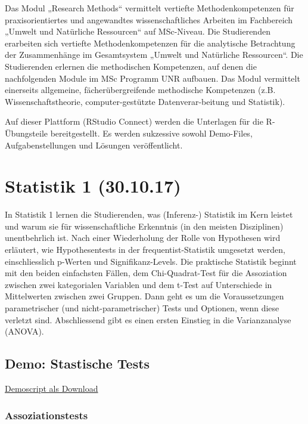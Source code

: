 \documentclass[]{book}
\begin{document}
Das Modul „Research Methods`` vermittelt vertiefte Methodenkompetenzen
für praxisorientiertes und angewandtes wissenschaftliches Arbeiten im
Fachbereich „Umwelt und Natürliche Ressourcen`` auf MSc-Niveau. Die
Studierenden erarbeiten sich vertiefte Methodenkompetenzen für die
analytische Betrachtung der Zusammenhänge im Gesamtsystem „Umwelt und
Natürliche Ressourcen``. Die Studierenden erlernen die methodischen
Kompetenzen, auf denen die nachfolgenden Module im MSc Programm UNR
aufbauen. Das Modul vermittelt einerseits allgemeine,
fächerübergreifende methodische Kompetenzen (z.B. Wissenschaftstheorie,
computer-gestützte Datenverar-beitung und Statistik).

Auf dieser Plattform (RStudio Connect) werden die Unterlagen für die
R-Übungsteile bereitgestellt. Es werden sukzessive sowohl Demo-Files,
Aufgabenstellungen und Lösungen veröffentlicht.

\chapter{Statistik 1 (30.10.17)}\label{statistik-1-30.10.17}

In Statistik 1 lernen die Studierenden, was (Inferenz-) Statistik im
Kern leistet und warum sie für wissenschaftliche Erkenntnis (in den
meisten Disziplinen) unentbehrlich ist. Nach einer Wiederholung der
Rolle von Hypothesen wird erläutert, wie Hypothesentests in der
frequentist-Statistik umgesetzt werden, einschliesslich p-Werten und
Signifikanz-Levels. Die praktische Statistik beginnt mit den beiden
einfachsten Fällen, dem Chi-Quadrat-Test für die Assoziation zwischen
zwei kategorialen Variablen und dem t-Test auf Unterschiede in
Mittelwerten zwischen zwei Gruppen. Dann geht es um die Voraussetzungen
parametrischer (und nicht-parametrischer) Tests und Optionen, wenn diese
verletzt sind. Abschliessend gibt es einen ersten Einstieg in die
Varianzanalyse (ANOVA).

\section{Demo: Stastische Tests}\label{demo-stastische-tests}

\href{13_Statistik1/RFiles/Demo_Tests.R}{Demoscript als Download}

\subsection{Assoziationstests}\label{assoziationstests}
\end{document}
